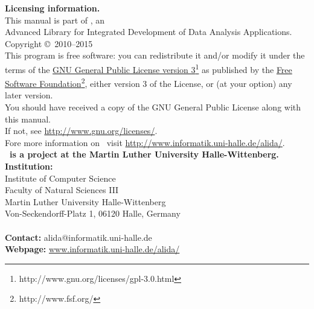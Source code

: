 \newpage
\thispagestyle{empty}
\parindent0pt
{\large \textbf{Licensing information.}}\\[0.5cm]
This manual is part of \alida, an\\
Advanced Library for Integrated Development of Data Analysis
Applications.\\[0.5cm] Copyright \copyright\ 2010--2015\\[0.5cm] 
This program is free software: you can redistribute it and/or modify
it under the terms of the
\href{http://www.gnu.org/licenses/gpl-3.0.html}
{GNU General Public License version	3}\footnote{http://www.gnu.org/licenses/gpl-3.0.html} as published by the \href{http://www.fsf.org/}{Free Software Foundation}\footnote{http://www.fsf.org/}, either version 3 of the License, or (at your option) any later version.\\
You should have received a copy of the GNU General Public License
along with this manual.\\
If not,
see \url{http://www.gnu.org/licenses/}.\\[1.0cm]
Fore more information on \alida\ visit
\href{http://www.informatik.uni-halle.de/alida/}{
http://www.informatik.uni-halle.de/alida/}.\\[5.0cm] 

{\large \textbf{\alida\ is a project at the Martin Luther University
Halle-Wittenberg.}}\\[0.5cm]

\textbf{Institution:}\\[0.5cm]
Institute of Computer Science\\
Faculty of Natural Sciences III\\
Martin Luther University Halle-Wittenberg\\
Von-Seckendorff-Platz 1, 06120 Halle, Germany\\\\
\textbf{Contact:} alida@informatik.uni-halle.de\\
\textbf{Webpage:} \url{www.informatik.uni-halle.de/alida/}
\parindent20pt
\newpage
{}


\tableofcontents

\setcounter{page}{1}
\clearpage
{}

